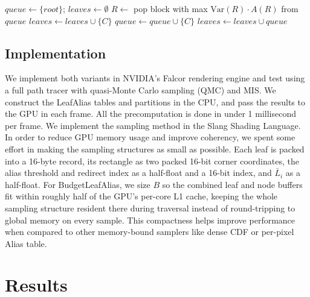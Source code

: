 \documentclass[acmtog,review,anonymous]{acmart}
\begin{document}
\begin{algorithm}[h]
\caption{Build a budgeted quadtree of $\leq B$ leaves}
\label{alg:budget}
\begin{algorithmic}[1]
\STATE $\mathit{queue} \leftarrow \{\mathit{root}\}$; \quad $\mathit{leaves} \leftarrow \emptyset$
  \STATE $R \leftarrow$ pop block with max $\mathrm{Var}(R)\cdot A(R)$ from $\mathit{queue}$
      \STATE $\mathit{leaves} \leftarrow \mathit{leaves} \cup \{C\}$
    \ELSE
      \STATE $\mathit{queue} \leftarrow \mathit{queue} \cup \{C\}$
    \ENDIF
  \ENDFOR
\ENDWHILE
\STATE $\mathit{leaves} \leftarrow \mathit{leaves} \cup \mathit{queue}$
\end{algorithmic}
\end{algorithm}

\subsection{Implementation}
\label{sec:impl}
We implement both variants in NVIDIA's Falcor rendering engine and test using a full path tracer with quasi-Monte Carlo sampling (QMC) and MIS. 
We construct the LeafAlias tables and partitions in the CPU, and pass the results to the GPU in each frame.
All the precomputation is done in under 1 millisecond per frame. We implement the sampling method in the Slang Shading Language.
In order to reduce GPU memory usage and improve coherency, we spent some effort in making the sampling structures as small as possible.
Each leaf is packed into a 16-byte record, its rectangle as two packed 16-bit corner coordinates, the alias threshold and redirect index
as a half-float and a 16-bit index, and $\bar{L}_i$ as a half-float. For BudgetLeafAlias, we size $B$ so the combined leaf and node buffers fit within roughly half of the GPU's per-core L1 cache, keeping the whole sampling structure resident there during
traversal instead of round-tripping to global memory on every sample. This compactness helps improve performance when compared to other memory-bound samplers like dense CDF or per-pixel Alias table.

\section{Results} \label{sec:results}
\end{document}
